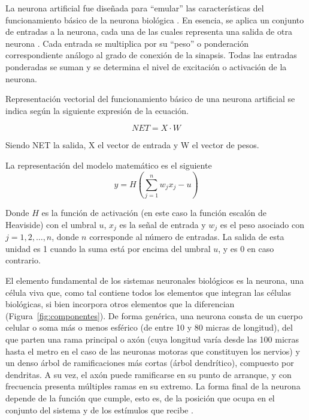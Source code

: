 \vspace{1\baselineskip}
La neurona artificial fue diseñada para “emular” las características del funcionamiento básico de la neurona biológica \cite{basogain2008redes}. En esencia, se aplica un conjunto de entradas a la neurona, cada una de las cuales representa una salida de otra neurona . Cada entrada se multiplica por su “peso” o ponderación correspondiente análogo al grado de conexión de la sinapsis. Todas las entradas ponderadas se suman y se determina el nivel de excitación o activación de la neurona.

Representación vectorial del funcionamiento básico de una neurona artificial se indica según la siguiente expresión de la ecuación.

\[
NET = X \cdot W
\]


Siendo NET la salida, X el vector de entrada y W el vector de pesos.

\vspace{1\baselineskip}
La representación del modelo matemático es el siguiente
\begin{equation}
  y = H\left(\sum_{j=1}^{n} w_jx_j - u\right)
  \end{equation}

Donde \(H\) es la función de activación (en este caso la función escalón de Heaviside) con el umbral \(u\), \(x_j\) es la señal de entrada y \(w_j\) es el peso asociado con \(j = 1,2,\ldots,n\), donde \(n\) corresponde al número de entradas. La salida de esta unidad es 1 cuando la suma está por encima del umbral \(u\), y es 0 en caso contrario\cite{arana2021redes}.

\vspace{1\baselineskip}
El elemento fundamental de los sistemas neuronales biológicos es la neurona, una célula viva que, como tal contiene todos los elementos que integran las células biológicas, si bien incorpora otros elementos que la diferencian (Figura~\ref{fig:componentes}). De forma genérica, una neurona consta de un cuerpo celular o soma más o menos esférico (de entre 10 y 80 micras de longitud), del que parten una rama principal o axón (cuya longitud varía desde las 100 micras hasta el metro en el caso de las neuronas motoras que constituyen los nervios) y un denso árbol de ramificaciones más cortas (árbol dendrítico), compuesto por dendritas. A su vez, el axón puede ramificarse en su punto de arranque, y con frecuencia presenta múltiples ramas en su extremo. La forma final de la neurona depende de la función que cumple, esto es, de la posición que ocupa en el conjunto del sistema y de los estímulos que recibe \cite{lopez2008redes}.

